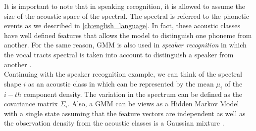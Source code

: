 \noindent It is important to note that in speaking recognition, it is allowed to assume the size of the acoustic space of the spectral. The spectral is referred to the phonetic events as we described in \ref{ch:english_language}. In fact, these acoustic classes have well defined features that allows the model to distinguish one phoneme from another. For the same reason, GMM is also used in \textit{speaker recognition} in which the vocal tracts spectral is taken into account to distinguish a speaker from another \cite{reynolds1992gaussian}. \\

\noindent Continuing with the speaker recognition example, we can think of the spectral shape $i$ as an acoustic class in which can be represented by the mean $\mu_{i}$ of the $i-th$ component density. The variation in the spectrum can be defined as the covariance matrix $\Sigma_{i}$. Also, a GMM can be views as a Hidden Markov Model with a single state assuming that the feature vectors are independent as well as the observation density from the acoustic classes is a Gaussian mixture \cite{reynolds2000speaker} \cite{reynolds1995robust}.
